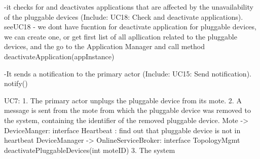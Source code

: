             -it checks for and deactivates applications that are affected by the unavailability of the
                pluggable devices (Include: UC18: Check and deactivate applications).
                seeUC18 - we dont have fucntion for deactivate application for pluggable devices, we can create one, or get
                            first list of all apllication related to the pluggable devices, and the go to the Application Manager and
                            call method deactivateApplication(appInstance)

            -It sends a notification to the primary actor (Include: UC15: Send notification).
            notify()



     UC7:
        1. The primary actor unplugs the pluggable device from its mote.
        2. A message is sent from the mote from which the pluggable device was removed to the system,
            containing the identifier of the removed pluggable device.
            Mote -> DeviceManger: interface Heartbeat : find out that pluggable device is not in heartbeat
            DeviceManager -> OnlineServiceBroker: interface TopologyMgmt deactivatePluggableDevices(int moteID)
        3. The system
